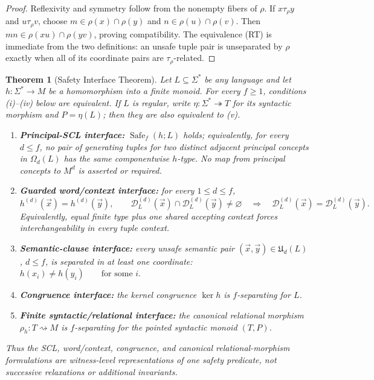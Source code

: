 \documentclass[10pt,a4paper]{article}
\newtheorem{theorem}{Theorem}[section]
\theoremstyle{definition}
\theoremstyle{remark}
\newcommand{\D}{\mathcal D}
\newcommand{\Om}{\Omega}
\newcommand{\relto}{\mathrel{\rightsquigarrow}}
\begin{document}
\begin{proof}
Reflexivity and symmetry follow from the nonempty fibers of \(\rho\).  If
\(x\tau_\rho y\) and \(u\tau_\rho v\), choose
\(m\in\rho(x)\cap\rho(y)\) and \(n\in\rho(u)\cap\rho(v)\).  Then
\(mn\in\rho(xu)\cap\rho(yv)\), proving compatibility.  The equivalence
\textup{(RT)} is immediate from the two definitions: an unsafe tuple pair is
unseparated by \(\rho\) exactly when all of its coordinate pairs are
\(\tau_\rho\)-related.
\end{proof}

\begin{theorem}[Safety Interface Theorem]
\label{alg:thm:safety-interface}
Let \(L\subseteq\Sigma^*\) be any language and let
\(h:\Sigma^*\to M\) be a homomorphism into a finite monoid.  For every
\(f\ge1\), conditions \textup{(i)}--\textup{(iv)} below are equivalent.  If
\(L\) is regular, write
\(\eta:\Sigma^*\twoheadrightarrow T\) for its syntactic morphism and
\(P=\eta(L)\); then they are also equivalent to \textup{(v)}.
\begin{enumerate}[label=(\roman*),leftmargin=*]
\item \textbf{Principal-SCL interface:}
\(\operatorname{Safe}_f(h;L)\) holds; equivalently, for every \(d\le f\),
no pair of generating tuples for two distinct adjacent principal concepts in
\(\Om_d(L)\) has the same componentwise \(h\)-type.  No map from principal
concepts to \(M^d\) is asserted or required.
\item \textbf{Guarded word/context interface:} for every \(1\le d\le f\),
\(h^{(d)}(\vec x)=h^{(d)}(\vec y),\qquad \D_L^{(d)}(\vec x)\cap\D_L^{(d)}(\vec y)\ne\varnothing \quad\Longrightarrow\quad \D_L^{(d)}(\vec x)=\D_L^{(d)}(\vec y).\)
Equivalently, equal finite type plus one shared accepting context forces
interchangeability in every tuple context.
\item \textbf{Semantic-clause interface:} every unsafe semantic pair
\((\vec x,\vec y)\in\mathfrak U_d(L)\), \(d\le f\), is separated in at least
one coordinate:
\(h(x_i)\ne h(y_i)\qquad\text{for some }i.\)
\item \textbf{Congruence interface:} the kernel congruence \(\ker h\) is
\(f\)-separating for \(L\).
\item \textbf{Finite syntactic/relational interface:} the canonical
relational morphism \(\rho_h:T\relto M\) is \(f\)-separating for the pointed
syntactic monoid \((T,P)\).
\end{enumerate}
Thus the SCL, word/context, congruence, and canonical relational-morphism
formulations are witness-level representations of one safety predicate, not
successive relaxations or additional invariants.
\end{theorem}
\end{document}
